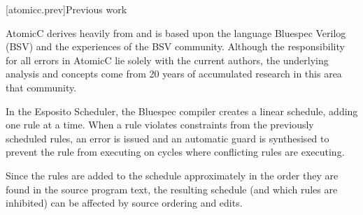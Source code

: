 [atomicc.prev]{Previous work}

AtomicC derives heavily from and is based upon the language Bluespec Verilog (BSV)
and the experiences of the BSV community.  Although the responsibility for all
errors in AtomicC lie solely with the current authors, the underlying analysis and
concepts come from 20 years of accumulated research in this area that community.

In the Esposito Scheduler\cite{Esposito:Patent},
the Bluespec compiler creates a linear schedule, adding
one rule at a time.  When a rule violates constraints from the previously scheduled
rules, an error is issued and an automatic guard is synthesised to prevent the
rule from executing on cycles where conflicting rules are executing.

Since the rules are added to the schedule approximately in the order they are
found in the source program text, the resulting schedule (and which rules are
inhibited) can be affected by source ordering and edits.
